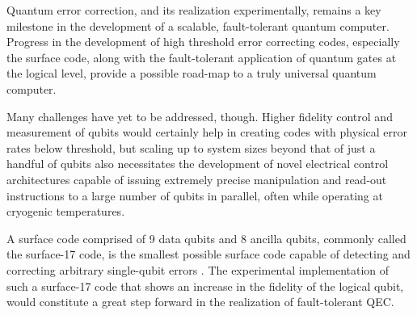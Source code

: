 Quantum error correction, and its realization experimentally, remains a key
milestone in the development of a scalable, fault-tolerant quantum computer.
Progress in the development of high threshold error correcting codes, especially
the surface code, along with the fault-tolerant application of quantum gates at
the logical level, provide a possible road-map to a truly universal quantum
computer.

Many challenges have yet to be addressed, though. Higher fidelity control and
measurement of qubits would certainly help in creating codes with physical error
rates below threshold, but scaling up to system sizes beyond that of just a
handful of qubits also necessitates the development of novel electrical control
architectures capable of issuing extremely precise manipulation and read-out
instructions to a large number of qubits in parallel, often while operating at
cryogenic temperatures.

A surface code comprised of 9 data qubits and 8 ancilla qubits, commonly called
the surface-17 code, is the smallest possible surface code capable of detecting
and correcting arbitrary single-qubit errors
\cite{obrien17_densit_matrix_simul_small_surfac}. The experimental
implementation of such a surface-17 code that shows an increase in the fidelity
of the logical qubit, would constitute a great step forward in the realization
of fault-tolerant QEC.


